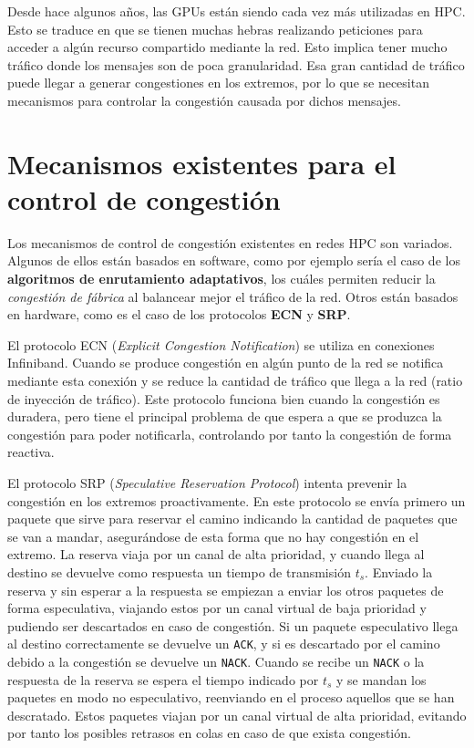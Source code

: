 \documentclass[11pt,a4paper]{article}
\begin{document}
Desde hace algunos años, las GPUs están siendo cada vez más utilizadas en HPC. Esto se traduce
en que se tienen muchas hebras realizando peticiones para acceder a algún recurso compartido
mediante la red. Esto implica tener mucho tráfico donde los mensajes son de poca granularidad.
Esa gran cantidad de tráfico puede llegar a generar congestiones en los extremos, por lo que se
necesitan mecanismos para controlar la congestión causada por dichos mensajes.

\section{Mecanismos existentes para el control de congestión}

Los mecanismos de control de congestión existentes en redes HPC son variados. Algunos de
ellos están basados en software, como por ejemplo sería el caso de los
\textbf{algoritmos de enrutamiento adaptativos}, los cuáles permiten reducir la
\textit{congestión de fábrica} al balancear mejor el tráfico de la red. Otros están
basados en hardware, como es el caso de los protocolos \textbf{ECN} y \textbf{SRP}.

El protocolo ECN (\textit{Explicit Congestion Notification}) se utiliza en conexiones
Infiniband. Cuando se produce congestión en algún punto de la red se notifica mediante
esta conexión y se reduce la cantidad de tráfico que llega a la red (ratio de inyección de
tráfico). Este protocolo funciona bien cuando la congestión es duradera, pero tiene el
principal problema de que espera a que se produzca la congestión para poder notificarla,
controlando por tanto la congestión de forma reactiva.

El protocolo SRP (\textit{Speculative Reservation Protocol}) intenta prevenir la congestión
en los extremos proactivamente. En este protocolo se envía primero un paquete que sirve
para reservar el camino indicando la cantidad de paquetes que se van a mandar, asegurándose
de esta forma que no hay congestión en el extremo. La reserva viaja por un canal de alta
prioridad, y cuando llega al destino se devuelve como respuesta un tiempo de transmisión $t_s$.
Enviado la reserva y sin esperar a la respuesta se empiezan a enviar los otros paquetes de forma
especulativa, viajando estos por un canal virtual de baja prioridad y pudiendo ser descartados
en caso de congestión. Si un paquete especulativo llega al destino correctamente se devuelve
un \texttt{ACK}, y si es descartado por el camino debido a la congestión se devuelve un
\texttt{NACK}. Cuando se recibe un \texttt{NACK} o la respuesta de la reserva se espera el tiempo
indicado por $t_s$ y se mandan los paquetes en modo no especulativo, reenviando en el proceso
aquellos que se han descratado. Estos paquetes viajan por un canal virtual de alta prioridad,
evitando por tanto los posibles retrasos en colas en caso de que exista congestión.
\end{document}
